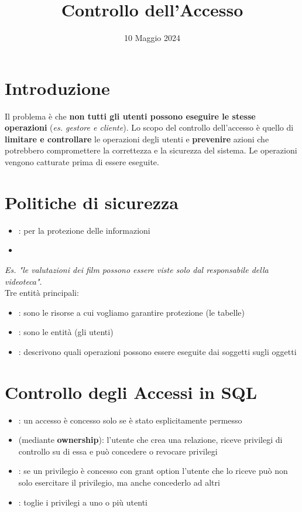 \documentclass[12pt]{article}
\title{Controllo dell'Accesso}
\date{10 Maggio 2024}
\begin{document}
\maketitle
\section{Introduzione}
Il problema è che \textbf{non tutti gli utenti possono eseguire le stesse operazioni} (\textit{es. gestore e cliente}). Lo scopo del controllo dell'accesso è quello di \textbf{limitare e controllare} le operazioni degli utenti e \textbf{prevenire} azioni che potrebbero compromettere la correttezza e la sicurezza del sistema. Le operazioni vengono catturate prima di essere eseguite.
\section{Politiche di sicurezza}
\begin{itemize}
    \item {}: per la protezione delle informazioni
    \item {}
\end{itemize}
\textit{Es. "le valutazioni dei film possono essere viste solo dal responsabile della videoteca"}.\\
Tre entità principali:
\begin{itemize}
    \item {}: sono le risorse a cui vogliamo garantire protezione (le tabelle)
    \item {}: sono le entità (gli utenti)
    \item {}: descrivono quali operazioni possono essere eseguite dai soggetti sugli oggetti
\end{itemize}
\section{Controllo degli Accessi in SQL}
\begin{itemize}
    \item {}: un accesso è concesso solo se è stato esplicitamente permesso
    \item {} (mediante \textbf{ownership}): l'utente che crea una relazione, riceve privilegi di controllo su di essa e può concedere o revocare privilegi
    \item {}: se un privilegio è concesso con grant option l'utente che lo riceve può non solo esercitare il privilegio, ma anche concederlo ad altri
    \item {}: toglie i privilegi a uno o più utenti
\end{itemize}
\end{document}
